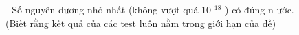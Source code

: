 - Số nguyên dương nhỏ nhất (không vượt quá 10   $^    18   $   ) có đúng n ước.   
\\   (Biết rằng kết quả của các test luôn nằm trong giới hạn của đề)